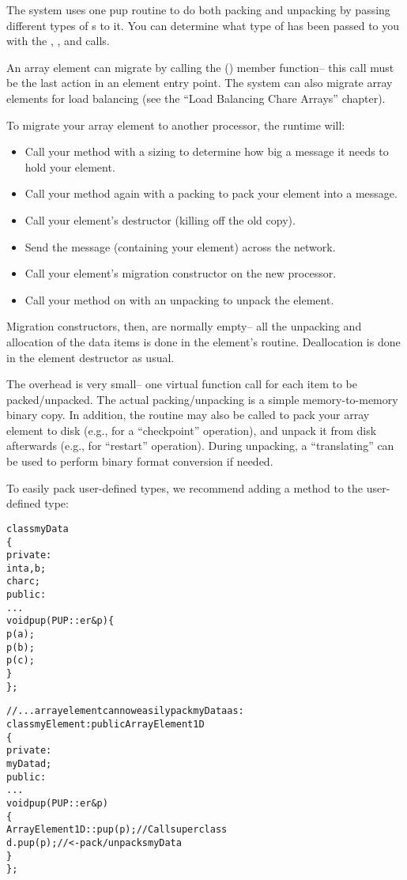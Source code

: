The system uses one pup routine to do both packing and unpacking by
passing different types of s to it.  You can determine
what type of  has been passed to you with the
, , and  calls.

An array element can migrate by calling the () member function-- this call must be the last action
in an element entry point.  The system can also migrate array elements
for load balancing (see the ``Load Balancing Chare Arrays'' chapter).

To migrate your array element to another processor, the \charmpp{}
runtime will:

\begin{itemize}
\item Call your  method with a sizing  to determine how 
big a message it needs to hold your element.
\item Call your  method again with a packing  to pack 
your element into a message.
\item Call your element's destructor (killing off the old copy).
\item Send the message (containing your element) across the network.
\item Call your element's migration constructor on the new processor.
\item Call your  method on with an unpacking  to unpack 
the element.
\end{itemize}

Migration constructors, then, are normally empty-- all the unpacking
and allocation of the data items is done in the element's  routine.
Deallocation is done in the element destructor as usual.

The  overhead is very small-- one virtual function call
for each item to be packed/unpacked.  The actual packing/unpacking is
a simple memory-to-memory binary copy.  In addition, the 
routine may also be called to pack your array element to disk (e.g.,
for a ``checkpoint'' operation), and unpack it from disk afterwards
(e.g., for ``restart'' operation).  During unpacking, a
``translating''  can be used to perform binary format
conversion if needed.

To easily pack user-defined types, we recommend adding
a  method to the user-defined type:

\begin{alltt}
class myData 
\{
private:
    int a,b;
    char c;
public:
    ...
    void pup(PUP::er \&p) \{
        p(a);
        p(b);
        p(c);
    \}
\};

//... array element can now easily pack myData as:
class myElement:public ArrayElement1D 
\{
private:
    myData d;
public:
    ...
    void pup(PUP::er \&p)
    \{
        ArrayElement1D::pup(p); //Call superclass
        d.pup(p); //<- pack/unpacks myData
    \}
\};
\end{alltt}


